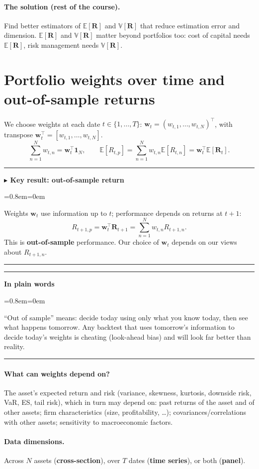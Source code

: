 \documentclass[11pt,a4paper]{report}
\newenvironment{notebox}[1]
  {\par\medskip\Needspace{6\baselineskip}\noindent\rule{\linewidth}{0.4pt}\par\nopagebreak
   \noindent\textbf{#1}\par\nopagebreak
   \begin{list}{}{\leftmargin=0.8em\rightmargin=0em\topsep=2pt}\item[]}
  {\end{list}\nopagebreak\noindent\rule{\linewidth}{0.4pt}\par\medskip}
\newenvironment{keybox}[1][]{\begin{notebox}{$\blacktriangleright$ Key result#1}}{\end{notebox}}
\newenvironment{plainbox}{\begin{notebox}{In plain words}}{\end{notebox}}
\newcommand{\E}{\mathbb{E}}
\newcommand{\V}{\mathbb{V}}
\newcommand{\one}{\mathbf{1}_N}
\newcommand{\w}{\bm{w}}
\newcommand{\R}{\bm{R}}
\newcommand{\T}{^{\top}}
\begin{document}
\paragraph{The solution (rest of the course).} Find better estimators of
$\E[\R]$ and $\V[\R]$ that reduce estimation error and dimension. $\E[\R]$
and $\V[\R]$ matter beyond portfolios too: cost of capital needs $\E[\R]$,
risk management needs $\V[\R]$.

\section{Portfolio weights over time and out-of-sample returns}

We choose weights at each date $t\in\{1,\dots,T\}$:
$\w_t=(w_{t,1},\dots,w_{t,N})\T$, with transpose $\w_t\T=[w_{t,1},\dots,w_{t,N}]$.
\[
  \sum_{n=1}^N w_{t,n}=\w_t\T\one,\qquad
  \E[R_{t,p}]=\sum_{n=1}^N w_{t,n}\E[R_{t,n}]=\w_t\T\E[\R_t].
\]

\begin{keybox}[: out-of-sample return]
Weights $\w_t$ use information up to $t$; performance depends on returns at $t+1$:
\[
  R_{t+1,p}=\w_t\T\R_{t+1}=\sum_{n=1}^N w_{t,n}R_{t+1,n}.
\]
This is \textbf{out-of-sample} performance. Our choice of $\w_t$ depends on our
views about $R_{t+1,n}$.
\end{keybox}

\begin{plainbox}
``Out of sample'' means: decide today using only what you know today, then see
what happens tomorrow. Any backtest that uses tomorrow's information to decide
today's weights is cheating (look-ahead bias) and will look far better than reality.
\end{plainbox}
\paragraph{What can weights depend on?} The asset's expected return and risk
(variance, skewness, kurtosis, downside risk, VaR, ES, tail risk), which in turn
may depend on: past returns of the asset and of other assets; firm
characteristics (size, profitability, \dots); covariances/correlations with
other assets; sensitivity to macroeconomic factors.

\paragraph{Data dimensions.} Across $N$ assets (\textbf{cross-section}), over
$T$ dates (\textbf{time series}), or both (\textbf{panel}).
\end{document}
